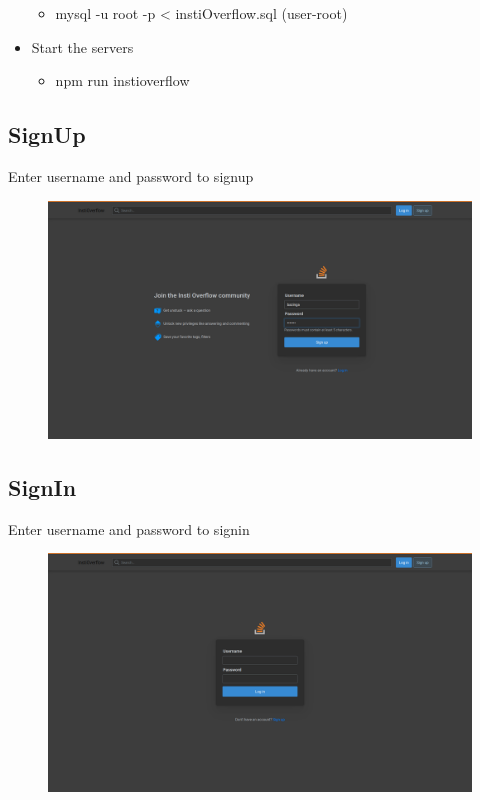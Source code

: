 \documentclass[12pt]{article}
\begin{document}
\begin{itemize}
\begin{itemize}
\item mysql -u root -p  < instiOverflow.sql   (user-root)
\end{itemize}

\item  Start the servers
\begin{itemize}
\item  npm run instioverflow 
\end{itemize}



\end{itemize}

\subsection{SignUp}
Enter username and password to signup\\


\begin{figure}[H]
\begin{center}
\includegraphics[width=0.75\columnwidth]{Signup}
\end{center}
\end{figure}

\subsection{SignIn}
Enter username and password to signin\\


\begin{figure}[H]
\begin{center}
\includegraphics[width=0.75\columnwidth]{Login}
\end{center}
\end{figure}
\end{document}
